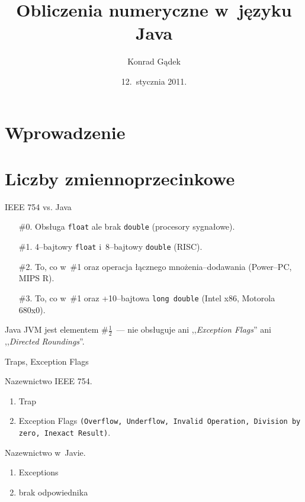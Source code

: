 \documentclass{beamer}
\author{Konrad Gądek}
\institute[AGH]{Akademia Górniczo-Hutnicza}
\date{12.~stycznia 2011.}
\title{Obliczenia numeryczne w~języku Java}
\begin{document}
\section*{Wprowadzenie}
\begin{frame}
	\titlepage
	\tableofcontents
\end{frame}

\section{Liczby zmiennoprzecinkowe}

\begin{frame}{IEEE 754 vs. Java}
	\begin{enumerate}
		\item[\#0.] Obsługa \texttt{float} ale brak \texttt{double} (procesory sygnałowe).
		\item[\#1.] 4--bajtowy \texttt{float} i~8--bajtowy \texttt{double} (RISC).
		\item[\#2.] To, co w~\alert{\#1} oraz operacja łącznego mnożenia--dodawania (Power--PC, MIPS R).
		\item[\#3.] To, co w~\alert{\#1} oraz +10--bajtowa \texttt{long double} (Intel x86, Motorola 680x0).
	\end{enumerate}
	\begin{alertblock}{Java}
		JVM jest elementem \#$\frac{1}{2}$~--- nie obsługuje ani ,,\emph{Exception Flags}'' ani ,,\emph{Directed
		Roundings}''.
	\end{alertblock}
\end{frame}

\begin{frame}{Traps, Exception Flags}
	\begin{block}{Nazewnictwo IEEE 754.}
		\begin{enumerate}
			\item Trap
			\item Exception Flags \texttt{(Overflow, Underflow, Invalid Operation, Division by zero,
				Inexact Result)}.
		\end{enumerate}
	\end{block}
	\begin{alertblock}{Nazewnictwo w~Javie.}
		\begin{enumerate}
			\item Exceptions
			\item \alert{brak odpowiednika}
		\end{enumerate}
	\end{alertblock}
\end{frame}
\end{document}
